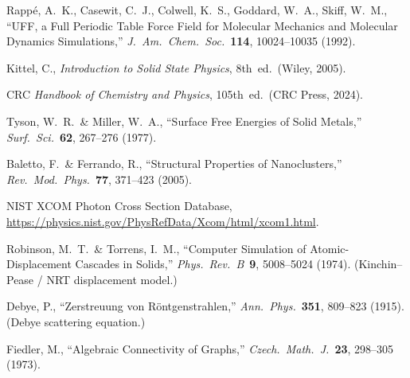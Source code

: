 \documentclass[11pt, a4paper, oneside]{article}
\begin{document}
\begin{enumerate}[label={[\arabic*]}, leftmargin=2em]
\item Rappé, A.~K., Casewit, C.~J., Colwell, K.~S., Goddard, W.~A.,
      Skiff, W.~M.,
      ``UFF, a Full Periodic Table Force Field for Molecular Mechanics
      and Molecular Dynamics Simulations,''
      \textit{J.~Am.\ Chem.\ Soc.}\ \textbf{114}, 10024--10035 (1992).

\item Kittel, C., \textit{Introduction to Solid State Physics},
      8th~ed.\ (Wiley, 2005).

\item CRC \textit{Handbook of Chemistry and Physics},
      105th~ed.\ (CRC Press, 2024).

\item Tyson, W.~R.\ \& Miller, W.~A.,
      ``Surface Free Energies of Solid Metals,''
      \textit{Surf.\ Sci.}\ \textbf{62}, 267--276 (1977).

\item Baletto, F.\ \& Ferrando, R.,
      ``Structural Properties of Nanoclusters,''
      \textit{Rev.\ Mod.\ Phys.}\ \textbf{77}, 371--423 (2005).

\item NIST XCOM Photon Cross Section Database,
      \url{https://physics.nist.gov/PhysRefData/Xcom/html/xcom1.html}.

\item Robinson, M.~T.\ \& Torrens, I.~M.,
      ``Computer Simulation of Atomic-Displacement Cascades in Solids,''
      \textit{Phys.\ Rev.\ B}\ \textbf{9}, 5008--5024 (1974).
      (Kinchin--Pease / NRT displacement model.)

\item Debye, P.,
      ``Zerstreuung von Röntgenstrahlen,''
      \textit{Ann.\ Phys.}\ \textbf{351}, 809--823 (1915).
      (Debye scattering equation.)

\item Fiedler, M.,
      ``Algebraic Connectivity of Graphs,''
      \textit{Czech.\ Math.\ J.}\ \textbf{23}, 298--305 (1973).
\end{enumerate}
\end{document}
